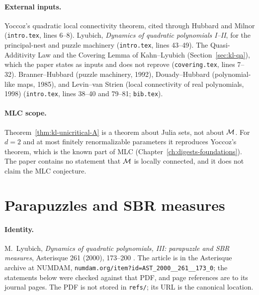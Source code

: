\paragraph{External inputs.}
Yoccoz's quadratic local connectivity theorem, cited through Hubbard and Milnor (\texttt{intro.tex}, lines 6--8).
Lyubich, \emph{Dynamics of quadratic polynomials I--II}, for the principal-nest and puzzle machinery (\texttt{intro.tex},
lines 43--49).  The Quasi-Additivity Law and the Covering Lemma of Kahn--Lyubich (Section~\ref{sec:kl-qa}), which the paper
states as inputs and does not reprove (\texttt{covering.tex}, lines 7--32).  Branner--Hubbard (puzzle machinery, 1992),
Douady--Hubbard (polynomial-like maps, 1985), and Levin--van Strien (local connectivity of real polynomials, 1998)
(\texttt{intro.tex}, lines 38--40 and 79--81; \texttt{bib.tex}).

\paragraph{MLC scope.}
Theorem~\ref{thm:kl-unicritical-A} is a theorem about Julia sets, not about $\mathcal M$.  For $d=2$ and at most finitely
renormalizable parameters it reproduces Yoccoz's theorem, which is the known part of MLC (Chapter~\ref{ch:digests-foundations}).
The paper contains no statement that $\mathcal M$ is locally connected, and it does not claim the MLC conjecture.

\section{Parapuzzles and SBR measures}
\label{sec:lyubich-ast261}

\paragraph{Identity.}
M.~Lyubich, \emph{Dynamics of quadratic polynomials, III: parapuzzle and SBR measures}, Asterisque 261 (2000),
173--200 \cite{LyubichIII}.  The article is in the Asterisque archive at NUMDAM, \texttt{numdam.org/item?id=AST\_2000\_\_261\_\_173\_0};
the statements below were checked against that PDF, and page references are to its journal pages.  The PDF is not
stored in \texttt{refs/}; its URL is the canonical location.

